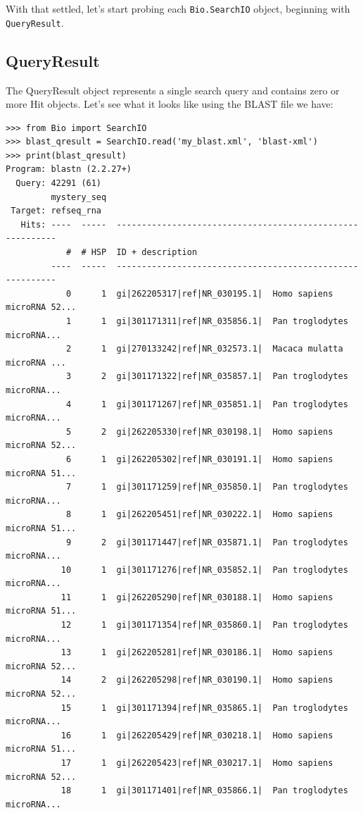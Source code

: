 \documentclass{report}
\begin{document}
With that settled, let's start probing each \verb|Bio.SearchIO| object,
beginning with \verb|QueryResult|.

\subsection{QueryResult}
\label{sec:searchio-qresult}

The QueryResult object represents a single search query and contains zero or
more Hit objects. Let's see what it looks like using the BLAST file we have:

\begin{verbatim}
>>> from Bio import SearchIO
>>> blast_qresult = SearchIO.read('my_blast.xml', 'blast-xml')
>>> print(blast_qresult)
Program: blastn (2.2.27+)
  Query: 42291 (61)
         mystery_seq
 Target: refseq_rna
   Hits: ----  -----  ----------------------------------------------------------
            #  # HSP  ID + description                                          
         ----  -----  ----------------------------------------------------------
            0      1  gi|262205317|ref|NR_030195.1|  Homo sapiens microRNA 52...
            1      1  gi|301171311|ref|NR_035856.1|  Pan troglodytes microRNA...
            2      1  gi|270133242|ref|NR_032573.1|  Macaca mulatta microRNA ...
            3      2  gi|301171322|ref|NR_035857.1|  Pan troglodytes microRNA...
            4      1  gi|301171267|ref|NR_035851.1|  Pan troglodytes microRNA...
            5      2  gi|262205330|ref|NR_030198.1|  Homo sapiens microRNA 52...
            6      1  gi|262205302|ref|NR_030191.1|  Homo sapiens microRNA 51...
            7      1  gi|301171259|ref|NR_035850.1|  Pan troglodytes microRNA...
            8      1  gi|262205451|ref|NR_030222.1|  Homo sapiens microRNA 51...
            9      2  gi|301171447|ref|NR_035871.1|  Pan troglodytes microRNA...
           10      1  gi|301171276|ref|NR_035852.1|  Pan troglodytes microRNA...
           11      1  gi|262205290|ref|NR_030188.1|  Homo sapiens microRNA 51...
           12      1  gi|301171354|ref|NR_035860.1|  Pan troglodytes microRNA...
           13      1  gi|262205281|ref|NR_030186.1|  Homo sapiens microRNA 52...
           14      2  gi|262205298|ref|NR_030190.1|  Homo sapiens microRNA 52...
           15      1  gi|301171394|ref|NR_035865.1|  Pan troglodytes microRNA...
           16      1  gi|262205429|ref|NR_030218.1|  Homo sapiens microRNA 51...
           17      1  gi|262205423|ref|NR_030217.1|  Homo sapiens microRNA 52...
           18      1  gi|301171401|ref|NR_035866.1|  Pan troglodytes microRNA...

\end{verbatim}
\end{document}
